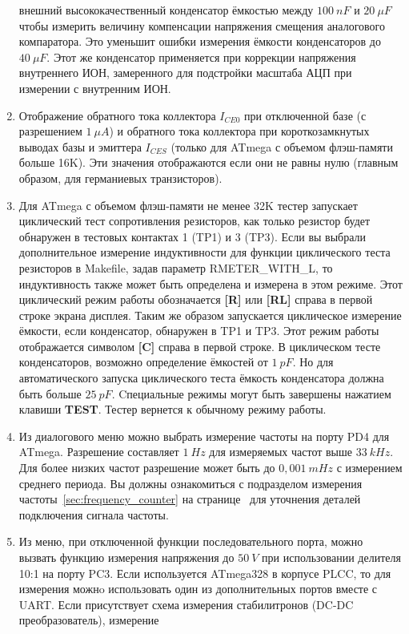\begin{enumerate}
внешний высококачественный конденсатор ёмкостью между \(100~nF\) и \(20~\mu F\) чтобы измерить величину компенсации 
напряжения смещения аналогового компаратора. Это уменьшит ошибки измерения ёмкости конденсаторов до \(40~\mu F\).
Этот же конденсатор применяется при коррекции напряжения внутреннего ИОН, замеренного для подстройки масштаба АЦП при 
измерении с внутренним ИОН.
\item Отображение обратного тока коллектора \(I_{CE0}\) при отключенной базе (с разрешением \(1~\mu A\)) и
обратного тока коллектора при короткозамкнутых выводах базы и эмиттера \(I_{CES}\) 
(только для ATmega с объемом флэш-памяти больше 16K).
Эти значения отображаются если они не равны нулю (главным образом, для германиевых транзисторов).
\item Для ATmega с объемом флэш-памяти не менее 32K тестер запускает циклический тест сопротивления резисторов,
как только резистор будет обнаружен в тестовых контактах 1 (TP1) и 3 (TP3).
Если вы выбрали дополнительное измерение индуктивности для функции циклического теста резисторов в
Makefile, задав параметр RMETER\_WITH\_L, то индуктивность также может быть определена и измерена в этом режиме.
Этот циклический режим работы обозначается \textbf{[R]} или \textbf{[RL]} справа в первой строке экрана дисплея.
Таким же образом запускается циклическое измерение ёмкости, если конденсатор, обнаружен в TP1 и TP3.
Этот режим работы отображается символом \textbf{[C]} справа в первой строке.
В циклическом тесте конденсаторов, возможно определение ёмкостей от \(1~pF\). Но для автоматического запуска
циклического теста ёмкость конденсатора должна быть больше \(25~pF\).
Cпециальные режимы могут быть завершены нажатием клавиши \textbf{ TEST}.
Тестер вернется к обычному режиму работы.
\item Из диалогового меню можно выбрать измерение частоты на порту PD4 для ATmega.
Разрешение составляет \(1~Hz\) для измеряемых частот выше \(33~kHz\).
Для более низких частот разрешение может быть до \(0,001~mHz\) с измерением среднего периода.
Вы должны ознакомиться с подразделом измерения частоты~\ref{sec:frequency_counter} на 
странице~\pageref{sec:frequency_counter} для уточнения деталей подключения сигнала частоты. 
\item Из меню, при отключенной функции последовательного порта, можно вызвать функцию измерения напряжения
до \(50~V\) при использовании делителя 10:1 на порту PC3. Если используется ATmega328 в корпусе PLCC, то для измерения
можнo использовать один из дополнительных портов вместе с UART. 
Если присутствует схема измерения стабилитронов (DC-DC преобразователь), измерение 

\end{enumerate}
